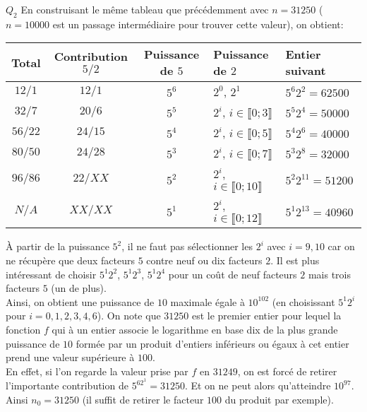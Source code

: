\documentclass[11pt] {article}
\begin{document}
$Q_{2}$ En construisant le même tableau que précédemment avec $n = 31250$ ($n = 10000$ est un passage intermédiaire pour trouver cette valeur), on obtient:

\begin{center}
	\begin{tabular}{cccll}
		Total & Contribution $5/2$	& Puissance de $5$	& Puissance de $2$	& Entier suivant \\
		\hline
		$12/1$	&	$12/1$	& $5^{6}$	& $2^{0}$, $2^{1}$	& $5^{6}2^{2} = 62500$ \\
		$32/7$	&	$20/6$	& $5^{5}$	& $2^{i}$, $i \in \llbracket 0; 3 \rrbracket$	& $5^{5}2^{4} = 50000$ \\
		$56/22$	&	$24/15$	& $5^{4}$	& $2^{i}$, $i \in \llbracket 0; 5 \rrbracket$	& $5^{4}2^{6} = 40000$ \\
		$80/50$	&	$24/28$	& $5^{3}$	& $2^{i}$, $i \in \llbracket 0; 7 \rrbracket$	& $5^{3}2^{8} = 32000$ \\
		$96/86$	&	$22/XX$	& $5^{2}$	& $2^{i}$, $i \in \llbracket 0; 10 \rrbracket$	& $5^{2}2^{11} = 51200$ \\
		$N/A$	&	$XX/XX$	& $5^{1}$	& $2^{i}$, $i \in \llbracket 0; 12 \rrbracket$	& $5^{1}2^{13} = 40960$ \\
	\end{tabular}
\end{center}

À partir de la puissance $5^{2}$, il ne faut pas sélectionner les $2^{i}$ avec $i = 9, 10$ car on ne récupère que deux facteurs $5$ contre neuf ou dix facteurs $2$. 
Il est plus intéressant de choisir $5^{1}2^{2}$, $5^{1}2^{3}$, $5^{1}2^{4}$ pour un coût de neuf facteurs $2$ mais trois facteurs $5$ (un de plus).\\

Ainsi, on obtient une puissance de $10$ maximale égale à $10^{102}$ (en choisissant $5^{1}2^{i}$ pour $i = 0, 1, 2, 3, 4, 6$).
On note que $31250$ est le premier entier pour lequel la fonction $f$ qui à un entier associe le logarithme en base dix de la plus grande puissance de $10$ formée
par un produit d'entiers inférieurs ou égaux à cet entier prend une valeur supérieure à $100$.\\

En effet, si l'on regarde la valeur prise par $f$ en $31249$, on est forcé de retirer l'importante contribution de $5^62^{1} = 31250$. Et on ne peut alors qu'atteindre $10^{97}$. Ainsi $n_0 = 31250$ (il suffit de retirer le facteur $100$ du produit par exemple).
\end{document}
